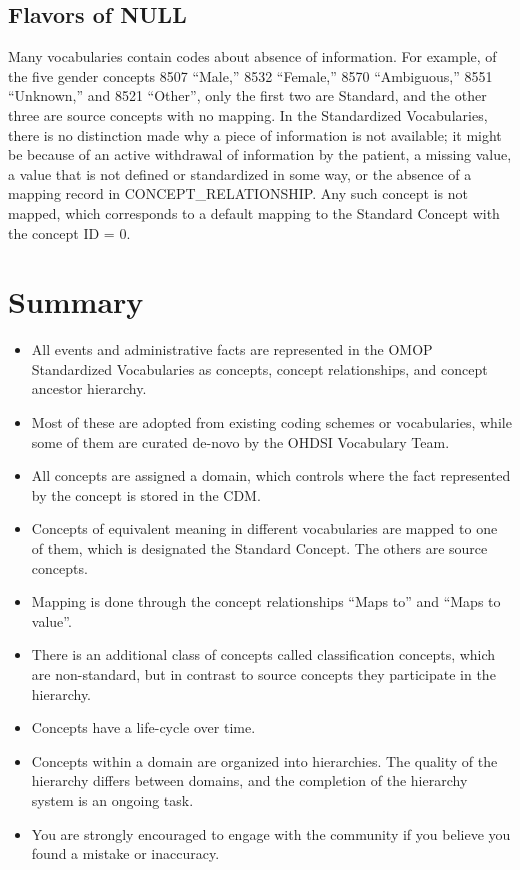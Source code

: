 \documentclass[11pt]{book}
\providecommand{\tightlist}{%
  \setlength{\itemsep}{0pt}\setlength{\parskip}{0pt}}
\theoremstyle{definition}
\theoremstyle{definition}
\theoremstyle{definition}
\theoremstyle{remark}
\let\BeginKnitrBlock\begin \let\EndKnitrBlock\end
\begin{document}
\subsection{Flavors of NULL}\label{flavors-of-null}

Many vocabularies contain codes about absence of information. For
example, of the five gender concepts 8507 ``Male,'' 8532 ``Female,''
8570 ``Ambiguous,'' 8551 ``Unknown,'' and 8521 ``Other'', only the first
two are Standard, and the other three are source concepts with no
mapping. In the Standardized Vocabularies, there is no distinction made
why a piece of information is not available; it might be because of an
active withdrawal of information by the patient, a missing value, a
value that is not defined or standardized in some way, or the absence of
a mapping record in CONCEPT\_RELATIONSHIP. Any such concept is not
mapped, which corresponds to a default mapping to the Standard Concept
with the concept ID = 0.

\section{Summary}\label{summary-2}

\BeginKnitrBlock{rmdsummary}
\begin{itemize}
\tightlist
\item
  All events and administrative facts are represented in the OMOP
  Standardized Vocabularies as concepts, concept relationships, and
  concept ancestor hierarchy.
\item
  Most of these are adopted from existing coding schemes or
  vocabularies, while some of them are curated de-novo by the OHDSI
  Vocabulary Team.
\item
  All concepts are assigned a domain, which controls where the fact
  represented by the concept is stored in the CDM.
\item
  Concepts of equivalent meaning in different vocabularies are mapped to
  one of them, which is designated the Standard Concept. The others are
  source concepts.
\item
  Mapping is done through the concept relationships ``Maps to'' and
  ``Maps to value''.
\item
  There is an additional class of concepts called classification
  concepts, which are non-standard, but in contrast to source concepts
  they participate in the hierarchy.
\item
  Concepts have a life-cycle over time.
\item
  Concepts within a domain are organized into hierarchies. The quality
  of the hierarchy differs between domains, and the completion of the
  hierarchy system is an ongoing task.
\item
  You are strongly encouraged to engage with the community if you
  believe you found a mistake or inaccuracy.
\end{itemize}
\EndKnitrBlock{rmdsummary}
\end{document}
